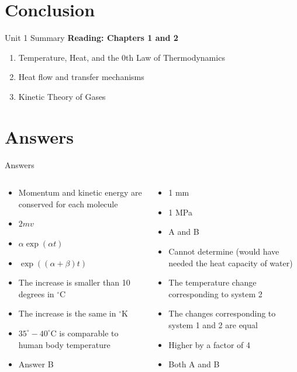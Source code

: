 \documentclass{beamer}
\begin{document}
\section{Conclusion}

\begin{frame}{Unit 1 Summary}
\textbf{Reading: Chapters 1 and 2}
\begin{enumerate}
\item Temperature, Heat, and the 0th Law of Thermodynamics
\item Heat flow and transfer mechanisms
\item Kinetic Theory of Gases
\end{enumerate}
\end{frame}

\section{Answers}

\begin{frame}{Answers}
\small
\begin{columns}[T]
\begin{column}{0.5\textwidth}
\begin{itemize}
\item Momentum and kinetic energy are conserved for each molecule
\item $2mv$
\item $\alpha\exp(\alpha t)$
\item $\exp((\alpha+\beta) t)$
\item The increase is smaller than 10 degrees in $^{\circ}$C
\item The increase is the same in $^{\circ}$K
\item $35^{\circ}-40^{\circ}$C is comparable to human body temperature
\item Answer B
\end{itemize}
\end{column}
\begin{column}{0.5\textwidth}
\begin{itemize}
\item 1 mm
\item 1 MPa
\item A and B
\item Cannot determine (would have needed the heat capacity of water)
\item The temperature change corresponding to system 2
\item The changes corresponding to system 1 and 2 are equal
\item Higher by a factor of 4
\item Both A and B
\end{itemize}
\end{column}
\end{columns}
\end{frame}
\end{document}
